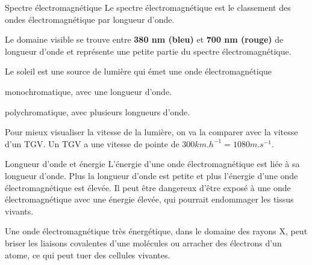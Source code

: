 \begin{doc}{Spectre électromagnétique}
  Le spectre électromagnétique est le classement des ondes électromagnétique par longueur d'onde. 
  \begin{center}
  \end{center}
  Le domaine visible se trouve entre \textbf{380 nm (bleu)} et \textbf{700 nm (rouge)} de longueur d'onde et représente une petite partie du spectre électromagnétique.
\end{doc}


\numeroQuestion
  Le soleil est une source de lumière qui émet une onde électromagnétique
\vspace*{-2pt}
\begin{qcm}
  \item monochromatique, avec une longueur d'onde.
  \item polychromatique, avec plusieurs longueurs d'onde.
\end{qcm}

Pour mieux visualiser la vitesse de la lumière, on va la comparer avec la vitesse d'un TGV.
Un TGV a une vitesse de pointe de $300 \unit{km.h}^{-1} = 1080 \unit{m.s}^{-1}$.
  



\begin{doc}{Longueur d'onde et énergie}
  L'énergie d'une onde électromagnétique est liée à sa longueur d'onde.
  Plus la longueur d'onde est petite et plus l'énergie d'une onde électromagnétique est élevée. 
  Il peut être dangereux d'être exposé à une onde électromagnétique avec une énergie élevée, qui pourrait endommager les tissus vivants.
  
  Une onde électromagnétique très énergétique, dans le domaine des rayons X, peut briser les liaisons covalentes d'une molécules ou arracher des électrons d'un atome, ce qui peut tuer des cellules vivantes.
\end{doc}


